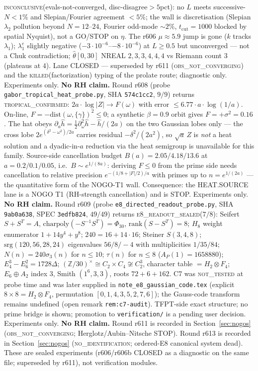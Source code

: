 \documentclass[11pt]{article}
\theoremstyle{definition}
\theoremstyle{remark}
\begin{document}
\textsc{inconclusive}(evals-not-converged, disc-disagree$>5$pct):
no $L$ meets successive-$N<1\%$ and Slepian/Fourier agreement
$<5\%$; the wall is discretisation (Slepian $\lambda_2$ pollution
beyond $N=12$--$24$, Fourier odd-mode $\sim 2\%$,
$t_{\mathrm{cut}}=1000$ blocked by spatial Nyquist), not a
GO/STOP on $\eta$.  The r606 $\mu\approx 5.9$ jump is gone
($k$ tracks $\lambda_1$); $\lambda_1^{e}$ slightly negative
($-3\cdot10^{-6}$--$-8\cdot10^{-6}$) at $L\ge 0.5$ but
unconverged --- not a Chuk contradiction; $\widehat\theta[0,30]$
NREAL $2,3,3,4,4,4$ vs Riemann count $3$ (plateaus at $4$).
Lane CLOSED --- superseded by r611
(\textsc{obs\_not\_converging}) and the
\textsc{killed}(factorization) typing of the prolate route;
diagnostic only.  Experiments only.  \textbf{No RH claim.}
Round r608 (probe \texttt{gabor\_tropical\_heat\_probe.py}, SHA
\texttt{574c1cc2}, $9/9$) returns \textsc{tropical\_confirmed}:
$2a\cdot\log\lvert Z\rvert\to F(\omega)$ with error
$\le 6.77\cdot a\cdot\log(1/a)$.  On-line,
$F=-\mathrm{dist}(\omega,\{\gamma\})^2\le 0$; a synthetic $\beta=0.9$
orbit gives $F=+\sigma^2=0.16$.  The hat obeys
$\partial_a\hat h=\tfrac12\partial_\omega^2\hat h-\hat h/(2a)$ on the
two Gaussian lobes only --- the cross lobe
$2e^{(\delta^2-\omega^2)/2a}$ carries residual $-\delta^2/(2a^2)$, so
$\sqrt{a}\,Z$ is \emph{not} a heat solution and a dyadic-in-$a$
reduction via the heat semigroup is unavailable for this family.
Source-side cancellation budget $B(a)=2.05/4.18/13.6$ at
$a=0.2/0.1/0.05$, i.e.\ $B\sim e^{1/(8a)}$: deriving $F\le 0$ from the
prime side needs cancellation to relative precision
$e^{-(1/8+\lvert F\rvert/2)/a}$ with primes up to $n=e^{1/(2a)}$ --- the
quantitative form of the NOGO-T1 wall.  Consequence: the HEAT.SOURCE
lane is a NOGO T1 (RH-strength cancellation) and is STOP.
Experiments only.  \textbf{No RH claim.}
Round r609 (probe \texttt{e8\_directed\_readout\_probe.py}, SHA
\texttt{9ab0a638}, SPEC \texttt{3edfb824}, $49/49$) returns
\textsc{e8\_readout\_sealed}($7/8$): Seifert $S+S^T=A$,
$\mathrm{charpoly}(-S^{-1}S^T)=\Phi_{30}$, $\mathrm{rank}(S-S^T)=8$;
$H_8$ weight enumerator $1+14y^4+y^8$; $240=16+14\cdot16$; Steiner
$S(3,4,8)$; $\mathrm{srg}(120,56,28,24)$ eigenvalues $56/8/-4$ with
multiplicities $1/35/84$; $N(n)=240\sigma_3(n)$ for $n\le10$;
$\tau(n)$ for $n\le8$ ($A_P(1)=1658880$); $E_4^3-E_6^2=1728\Delta$;
$(\mathbb{Z}/30)^\times\cong C_2\times C_4\not\cong C_2^3$, character
table $=H_2\otimes F_4$; $E_6\oplus A_2$ index $3$, Smith
$(1^6,3,3)$, roots $72+6+162$.  C7 was \textsc{not\_tested} at probe
time and was later supplied in \texttt{note\_e8\_gaussian\_code.tex}
(explicit $8\times8=H_2\otimes F_4$, permutation
$[0,1,4,3,5,2,7,6]$); the Gauss-code transform remains undefined
(open remark \texttt{rem:c7-audit}).  TFPT-side exact structure; no
prime bridge is shown; promotion to \texttt{verification/} is a
pending user decision.  Experiments only.  \textbf{No RH claim.}
Round r611 is recorded in Section~\ref{sec:nogos}
(\textsc{obs\_not\_converging}; Herglotz/Aubin--Nitsche STOP).
Round r613 is recorded in Section~\ref{sec:nogos}
(\textsc{no\_identification}; ordered-E8 canonical system dead).
These are sealed experiments (r606/r606b CLOSED as a diagnostic
on the same file; superseded by r611), not verification modules.
\end{document}
